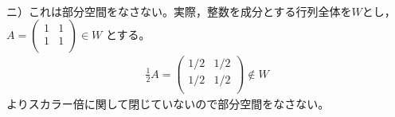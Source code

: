 \documentclass[dvipdfmx,uplatex,11pt]{jsarticle}
\begin{document}
\dotfill \\
ニ）これは部分空間をなさない。実際，整数を成分とする行列全体を$Wとし，$
$
A=
\begin{pmatrix}
1 & 1 \\
1 & 1 \\
\end{pmatrix}
\in W
$
とする。
\begin{eqnarray*}
\frac{1}{2}A=
\begin{pmatrix}
1/2 & 1/2 \\
1/2 & 1/2 \\
\end{pmatrix}
\not\in W
\end{eqnarray*}
よりスカラー倍に関して閉じていないので部分空間をなさない。\\
\dotfill \\
\newpage
\end{document}
